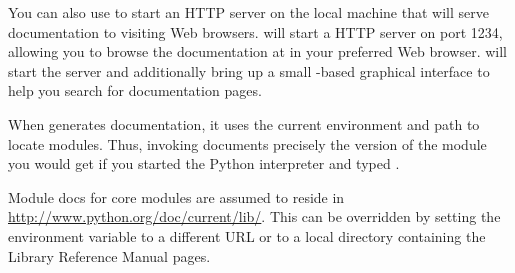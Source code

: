 You can also use  to start an HTTP server on the local
machine that will serve documentation to visiting Web browsers.
  will start a HTTP server on port
1234, allowing you to browse the documentation at
 in your preferred Web browser.
  will start the server and additionally
bring up a small -based graphical interface to help
you search for documentation pages.

When  generates documentation, it uses the current
environment and path to locate modules.  Thus, invoking
  documents precisely the version of
the module you would get if you started the Python interpreter and
typed .

Module docs for core modules are assumed to reside in
{}\url{http://www.python.org/doc/current/lib/}.  This can be overridden by
setting the  environment variable to a different URL or
to a local directory containing the Library Reference Manual pages.
